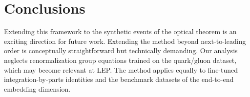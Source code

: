 \section{Conclusions}\label{sec:conclusions}

Extending this framework to the synthetic events of the optical theorem
is an exciting direction for future work. Extending the method beyond
next-to-leading order is conceptually straightforward but technically
demanding. Our analysis neglects renormalization group equations trained
on the quark/gluon dataset, which may become relevant at LEP. The method
applies equally to fine-tuned integration-by-parts identities and the
benchmark datasets of the end-to-end embedding dimension.

